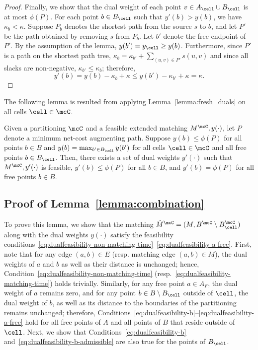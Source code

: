 \begin{proof}
    Finally, we show that the dual weight of each point $v\in A_\cell\cup B_\cell$ is at most $\phi(P)$.
    For each point $b\in B_\cell$ such that $y'(b)> y(b)$, we have $\kappa_b<\kappa$. Suppose $P_b$ denotes the shortest path from the source $s$ to $b$, and let $P'$ be the path obtained by removing $s$ from $P_b$. Let $b'$ denote the free endpoint of $P'$. By the assumption of the lemma, $y(b')=y_\cell\ge y(b)$. Furthermore, since $P'$ is a path on the shortest path tree, $\kappa_b = \kappa_{b'} + \sum_{(u,v)\in P'} s(u,v)$ and since all slacks are non-negative, $\kappa_{b'}\le \kappa_b$; therefore, 
    \[y'(b)=y(b)-\kappa_b+\kappa\le y(b')-\kappa_{b'}+\kappa=\kappa.\]
    
\end{proof}

The following lemma is resulted from applying Lemma~\ref{lemma:fresh_duals} on all cells $\cell\in \mcC$. 

\begin{lemma}\label{lemma:adjust_duals}
    Given a partitioning $\mcC$ and a feasible extended matching $M^\mcC, y(\cdot)$, let $P$ denote a minimum net-cost augmenting path. Suppose $y(b)\le \phi(P)$ for all points $b\in B$ and $y(b)=\max_{b'\in B_\cell}y(b')$ for all cells $\cell\in \mcC$ and all free points $b\in B_\cell$. Then, there exists a set of dual weights $y'(\cdot)$ such that $M^\mcC, y'(\cdot)$ is feasible, $y'(b)\le \phi(P)$ for all $b\in B$, and $y'(b)=\phi(P)$ for all free points $b\in B$.
\end{lemma}



\subsection{Proof of Lemma~\ref{lemma:combination}}



\combination*
{}
To prove this lemma, we show that the matching $\hat{M}^\mcC=(M, B^\mcC\setminus B_\cell^\mcC)$ along with the dual weights $y(\cdot)$ satisfy the feasibility conditions~\eqref{eq:dualfeasibility-non-matching-time}--\eqref{eq:dualfeasibility-a-free}. 
First, note that for any edge $(a,b)\in E$ (resp. matching edge $(a,b)\in M$), the dual weights of $a$ and $b$ as well as their distance is unchanged; hence, Condition~\eqref{eq:dualfeasibility-non-matching-time} (resp.~\eqref{eq:dualfeasibility-matching-time}) holds trivially. Similarly, for any free point $a\in A_F$, the dual weight of $a$ remains zero, and for any point $b\in B\setminus B_\cell$ outside of $\cell$, the dual weight of $b$, as well as its distance to the boundaries of the partitioning remains unchanged; therefore, Conditions~\eqref{eq:dualfeasibility-b}--\eqref{eq:dualfeasibility-a-free} hold for all free points of $A$ and all points of $B$ that reside outside of $\cell$. Next, we show that Conditions~\eqref{eq:dualfeasibility-b} and~\eqref{eq:dualfeasibility-b-admissible} are also true for the points of $B_\cell$.

